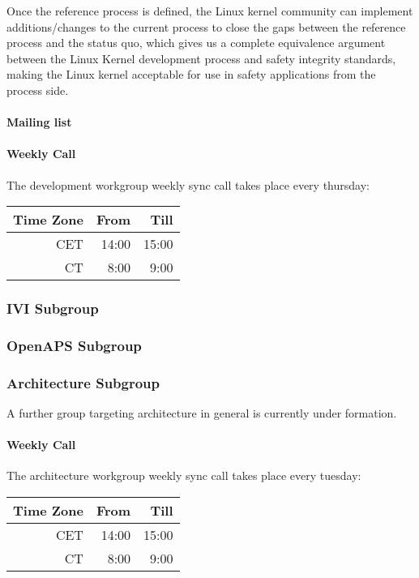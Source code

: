 \documentclass[12pt]{ElisaPaper}
\begin{document}
Once the reference process is defined, the Linux kernel community can implement additions/changes to the current process to close the gaps between the reference process and the status quo, which gives us a complete equivalence argument between the Linux Kernel development process and safety integrity standards, making the Linux kernel acceptable for use in safety applications from the process side. 

\paragraph{Mailing list}

\paragraph{Weekly Call}
The development workgroup weekly sync call takes place every thursday:

\begin{center}
\begin{tabular}{rrr}
	\toprule
	Time Zone & From & Till\\
	\midrule
	CET	& 14:00 & 15:00 \\
	CT & 8:00 & 9:00 \\
	\bottomrule
\end{tabular} 
\end{center}
\subsubsection{IVI Subgroup}
\label{sssec:IVI Subgroup}
\subsubsection{OpenAPS Subgroup}
\label{sssec:OpenAPS subgroup}
\subsubsection{Architecture Subgroup}
A further group targeting architecture in general is currently under formation.
\paragraph{Weekly Call}
The architecture workgroup weekly sync call takes place every tuesday:

\begin{center}
	\begin{tabular}{rrr}
		\toprule
		Time Zone & From & Till\\
		\midrule
		CET	& 14:00 & 15:00 \\
		CT & 8:00 & 9:00 \\
		\bottomrule
	\end{tabular} 
\end{center}
\end{document}
